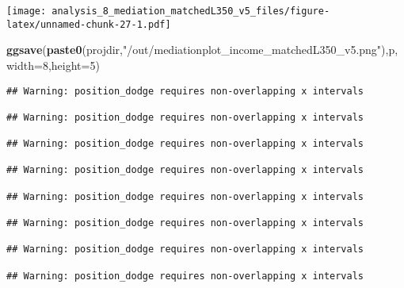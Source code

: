 \documentclass[
]{article}
\newenvironment{Shaded}{\begin{snugshade}}{\end{snugshade}}
\newcommand{\DataTypeTok}[1]{\textcolor[rgb]{0.13,0.29,0.53}{#1}}
\newcommand{\DecValTok}[1]{\textcolor[rgb]{0.00,0.00,0.81}{#1}}
\newcommand{\KeywordTok}[1]{\textcolor[rgb]{0.13,0.29,0.53}{\textbf{#1}}}
\newcommand{\NormalTok}[1]{#1}
\newcommand{\StringTok}[1]{\textcolor[rgb]{0.31,0.60,0.02}{#1}}
\begin{document}
\texttt{[image: analysis\_8\_mediation\_matchedL350\_v5\_files/figure-latex/unnamed-chunk-27-1.pdf]}

\begin{Shaded}
\begin{Highlighting}[]
\KeywordTok{ggsave}\NormalTok{(}\KeywordTok{paste0}\NormalTok{(projdir,}\StringTok{"/out/mediationplot_income_matchedL350_v5.png"}\NormalTok{),p,}\DataTypeTok{width=}\DecValTok{8}\NormalTok{,}\DataTypeTok{height=}\DecValTok{5}\NormalTok{)}
\end{Highlighting}
\end{Shaded}

\begin{verbatim}
## Warning: position_dodge requires non-overlapping x intervals

## Warning: position_dodge requires non-overlapping x intervals

## Warning: position_dodge requires non-overlapping x intervals

## Warning: position_dodge requires non-overlapping x intervals

## Warning: position_dodge requires non-overlapping x intervals

## Warning: position_dodge requires non-overlapping x intervals

## Warning: position_dodge requires non-overlapping x intervals

## Warning: position_dodge requires non-overlapping x intervals
\end{verbatim}
\end{document}
